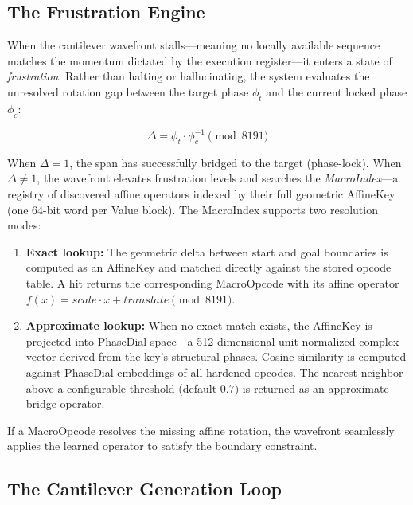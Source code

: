 \subsection{The Frustration Engine}
\label{sec:frustration_engine}

When the cantilever wavefront stalls---meaning no locally available sequence matches the momentum dictated by the execution register---it enters a state of \emph{frustration}. Rather than halting or hallucinating, the system evaluates the unresolved rotation gap between the target phase $\phi_t$ and the current locked phase $\phi_c$:

\begin{equation}
  \Delta = \phi_t \cdot \phi_c^{-1} \pmod{8191}
  \label{eq:frustration_gap}
\end{equation}

When $\Delta = 1$, the span has successfully bridged to the target (phase-lock). When $\Delta \neq 1$, the wavefront elevates frustration levels and searches the \emph{MacroIndex}---a registry of discovered affine operators indexed by their full geometric AffineKey (one 64-bit word per Value block). The MacroIndex supports two resolution modes:

\begin{enumerate}[nosep]
  \item \textbf{Exact lookup:} The geometric delta between start and goal boundaries is computed as an AffineKey and matched directly against the stored opcode table. A hit returns the corresponding MacroOpcode with its affine operator $f(x) = \mathit{scale} \cdot x + \mathit{translate} \pmod{8191}$.
  \item \textbf{Approximate lookup:} When no exact match exists, the AffineKey is projected into PhaseDial space---a 512-dimensional unit-normalized complex vector derived from the key's structural phases. Cosine similarity is computed against PhaseDial embeddings of all hardened opcodes. The nearest neighbor above a configurable threshold (default $0.7$) is returned as an approximate bridge operator.
\end{enumerate}

If a MacroOpcode resolves the missing affine rotation, the wavefront seamlessly applies the learned operator to satisfy the boundary constraint.

\subsection{The Cantilever Generation Loop}
\label{sec:cantilever_loop}

